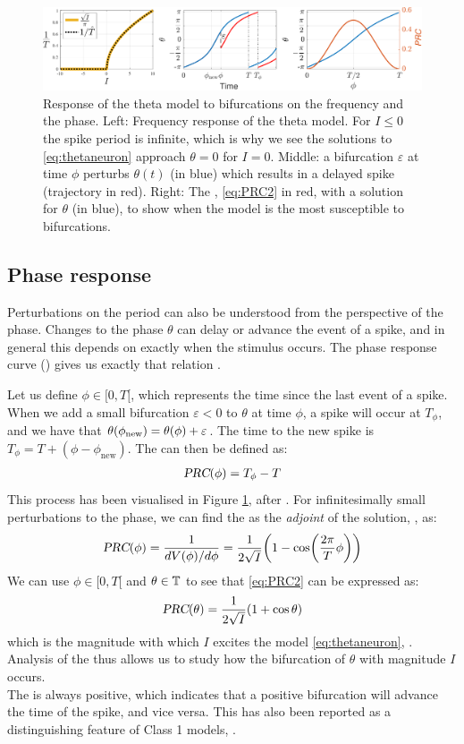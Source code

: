 \begin{figure}[H]
\centering
\includegraphics[width = \textwidth]{../Figures/ThetaNeuronfIandPRC.pdf}
\caption{Response of the theta model to bifurcations on the frequency and the phase. Left: Frequency response of the theta model. For $I \leq 0$ the spike period is infinite, which is why we see the solutions to \eqref{eq:thetaneuron} approach $\theta = 0$ for $I = 0$. Middle: a bifurcation $\varepsilon$ at time $\phi$ perturbs $\theta(t)$ (in blue) which results in a delayed spike (trajectory in red). Right: The \PRC, \eqref{eq:PRC2} in red, with a solution for $\theta$ (in blue), to show when the model is the most susceptible to bifurcations.}
\label{fig:ThetaNeuronfIandPRC}
\end{figure}


\subsection{Phase response} \label{sec:TheThetaNeuronModelPhaseResponse}
Perturbations on the period can also be understood from the perspective of the phase. Changes to the phase $\theta$ can delay or advance the event of a spike, and in general this depends on exactly when the stimulus occurs. The phase response curve (\PRC) gives us exactly that relation \cite{Perez2020, Gutkin2014}.

Let us define $\phi \in [0, T[$, which represents the time since the last event of a spike. When we add a small bifurcation $\varepsilon < 0 $ to $\theta$ at time $\phi$, a spike will occur at $T_{\phi}$, and we have that $\theta(\phi_{\rm new}) = \theta(\phi) + \varepsilon$. The time to the new spike is $T_{\phi} = T + (\phi - \phi_{\text{new}})$. The \PRC can then be defined as:
\begin{align}
{\textsl{PRC}}(\phi) =T_{\phi} - T \label{eq:PRC1}
\end{align}
This process has been visualised in Figure \ref{fig:ThetaNeuronfIandPRC}, after \cite{Perez2020}. For infinitesimally small perturbations to the phase, we can find the \PRC as the \textsl{adjoint} of the solution, \cite{Gutkin2014}, as:
\begin{align}
\PRC(\phi) = \frac{1}{d V(\phi) / d \phi} = \frac{1}{2 \sqrt{I}} \left(1-\cos \left( \frac{2 \pi}{T} \phi \right) \right) \label{eq:PRC2}
\end{align}
We can use $\phi \in [0, T[$ and $\theta \in {\mathbb{T}}$ to see that \eqref{eq:PRC2} can be expressed as:
\begin{align}
\PRC(\theta) = \frac{1}{2 \sqrt{I}} \left( 1 + \cos \theta \right) \label{eq:PRC3}
\end{align}
which is the magnitude with which $I$ excites the model \eqref{eq:thetaneuron}, \cite{Ermentrout1996}. Analysis of the \PRC thus allows us to study how the bifurcation of $\theta$ with magnitude $I$ occurs.\\

The \PRC is always positive, which indicates that a positive bifurcation will advance the time of the spike, and vice versa. This has also been reported as a distinguishing feature of Class 1 models, \cite{Ermentrout1996}.

